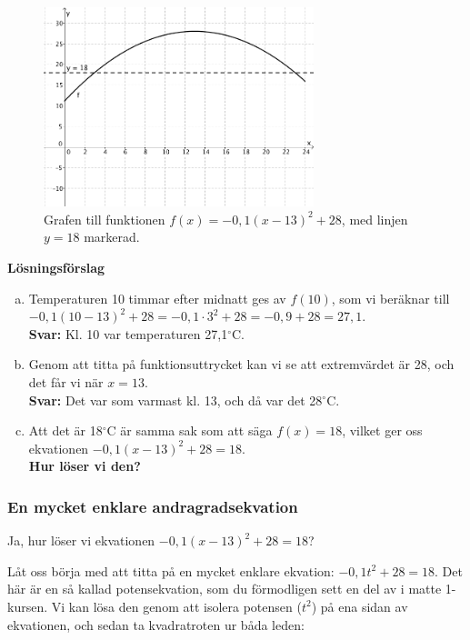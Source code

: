 \begin{figure}
  \centering
  \includegraphics[width=0.7\textwidth]{bilder/temperatur.png}
  \caption{\label{fig:temperatur}Grafen till funktionen $f(x) = -0,1(x-13)^2+28$, med linjen $y=18$ markerad.}
\end{figure}

\textbf{Lösningsförslag}
\begin{enumerate}[(a)]
  \item Temperaturen 10 timmar efter midnatt ges av $f(10)$, som vi beräknar till $-0,1(10-13)^2+28 = -0,1 \cdot 3^2 + 28 = -0,9+28 = 27,1$. \\
  \textbf{Svar:} Kl. 10 var temperaturen 27,1$^{\circ}$C.
  \item Genom att titta på funktionsuttrycket kan vi se att extremvärdet är 28, och det får vi när $x=13$. \\
  \textbf{Svar:} Det var som varmast kl. 13, och då var det 28$^{\circ}$C.
  \item Att det är 18$^{\circ}$C är samma sak som att säga $f(x)=18$, vilket ger oss ekvationen $-0,1(x-13)^2+28=18$. \\
  \textbf{Hur löser vi den?}
\end{enumerate}

\subsubsection{En mycket enklare andragradsekvation}

Ja, hur löser vi ekvationen $-0,1(x-13)^2+28=18$?

Låt oss börja med att titta på en mycket enklare ekvation: $-0,1t^2+28=18$.
Det här är en så kallad potensekvation, som du förmodligen sett en del av i matte 1-kursen.
Vi kan lösa den genom att isolera potensen ($t^2$) på ena sidan av ekvationen, och sedan ta kvadratroten ur båda leden:

